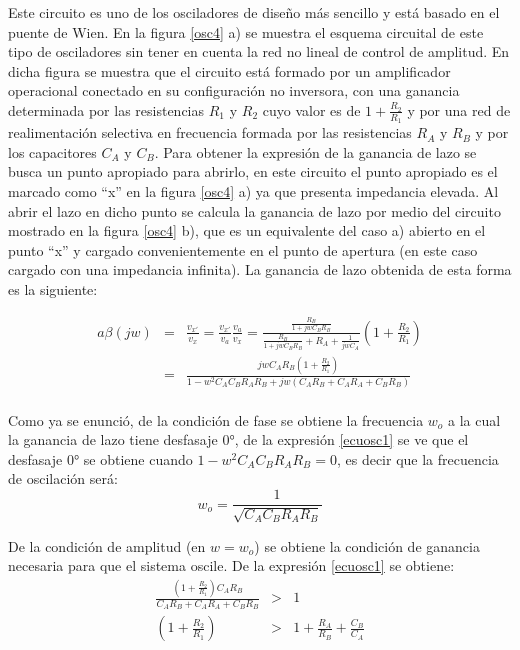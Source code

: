 \hspace{10pt} Este circuito es uno de los osciladores de diseño más sencillo y está basado
en el puente de Wien. En la figura \ref{osc4} a) se muestra el esquema
circuital de este tipo de osciladores sin tener en cuenta la red no
lineal de control de amplitud. En dicha figura se muestra que el
circuito está formado por un amplificador operacional conectado en
su configuración no inversora, con una ganancia determinada por las
resistencias $R_1$ y $R_2$ cuyo valor es de $1+\frac{\displaystyle R_2}{\displaystyle R_1}$ y
por una red de realimentación selectiva en frecuencia formada por
las resistencias $R_A$ y $R_B$ y por los capacitores $C_A$ y $C_B$.
Para obtener la expresión de la ganancia de lazo se busca un punto
apropiado para abrirlo, en este circuito el punto apropiado es el
marcado como ``x'' en la figura \ref{osc4} a) ya que presenta impedancia elevada. Al abrir el lazo en
dicho punto se calcula la ganancia de lazo por medio del circuito
mostrado en la figura \ref{osc4} b), que es un equivalente del caso
a) abierto en el punto ``x'' y cargado convenientemente en el punto
de apertura (en este caso cargado con una impedancia infinita). La
ganancia de lazo obtenida de esta forma es la siguiente:


\begin{eqnarray}\label{ecuosc1}
	\nonumber
	a\beta(jw)&=&\frac{\displaystyle v_{x'}}{\displaystyle v_x}=\frac{\displaystyle v_{x'}}{\displaystyle v_a}\frac{\displaystyle v_a}{\displaystyle v_x}=\frac{\frac{\displaystyle R_B}{\displaystyle 1+jwC_BR_B}}{\frac{\displaystyle R_B}{\displaystyle 1+jwC_BR_B}+R_A+\frac{\displaystyle 1}{\displaystyle
			jwC_A}}\left(1+\frac{\displaystyle R_2}{\displaystyle R_1}\right)\\
	\nonumber
	&=&\frac{\displaystyle jwC_AR_B\left(1+\frac{\displaystyle R_2}{\displaystyle R_1}\right)}{1-w^2C_AC_BR_AR_B+jw\left(C_AR_B+C_AR_A+C_BR_B\right)}\\
\end{eqnarray}

Como ya se enunció, de la condición de fase se obtiene la frecuencia
$w_o$ a la cual la ganancia de lazo tiene desfasaje $0°$, de la
expresión \ref{ecuosc1} se ve que el desfasaje $0°$ se obtiene
cuando $1-w^2C_AC_BR_AR_B=0$, es decir que la frecuencia de
oscilación será:
\begin{equation*}
	w_o=\frac{\displaystyle 1}{\displaystyle \sqrt{C_AC_BR_AR_B}}
\end{equation*}

De la condición de amplitud (en $w=w_o$) se obtiene la condición de
ganancia necesaria para que el sistema oscile. De la expresión
\ref{ecuosc1} se obtiene:
\begin{eqnarray}
	\nonumber
	\frac{\displaystyle \left(1+\frac{\displaystyle R_2}{\displaystyle R_1}\right)C_AR_B}{\displaystyle C_AR_B+C_AR_A+C_BR_B}&>&1\\
	\nonumber
	\left(1+\frac{\displaystyle R_2}{\displaystyle R_1}\right)&>&1+\frac{\displaystyle R_A}{\displaystyle R_B}+\frac{\displaystyle C_B}{\displaystyle C_A}\\
	\nonumber
\end{eqnarray}

